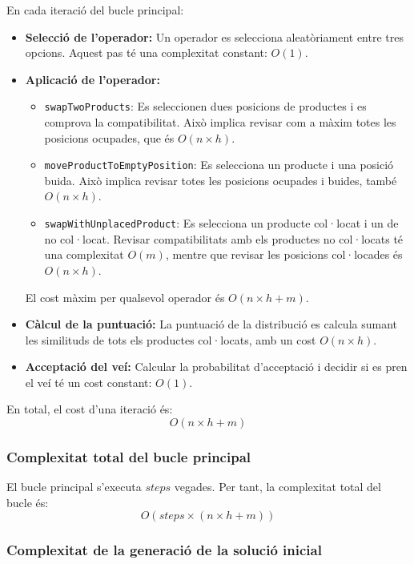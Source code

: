 \documentclass[a4paper,12pt]{report}
\begin{document}
\begin{itemize}
En cada iteració del bucle principal:
\begin{itemize}
    \item \textbf{Selecció de l'operador:} Un operador es selecciona aleatòriament entre tres opcions. Aquest pas té una complexitat constant: \(O(1)\).
    \item \textbf{Aplicació de l'operador:} 
    \begin{itemize}
        \item \texttt{swapTwoProducts}: Es seleccionen dues posicions de productes i es comprova la compatibilitat. Això implica revisar com a màxim totes les posicions ocupades, que és \(O(n \times h)\).
        \item \texttt{moveProductToEmptyPosition}: Es selecciona un producte i una posició buida. Això implica revisar totes les posicions ocupades i buides, també \(O(n \times h)\).
        \item \texttt{swapWithUnplacedProduct}: Es selecciona un producte col·locat i un de no col·locat. Revisar compatibilitats amb els productes no col·locats té una complexitat \(O(m)\), mentre que revisar les posicions col·locades és \(O(n \times h)\).
    \end{itemize}
    El cost màxim per qualsevol operador és \(O(n \times h + m)\).
    \item \textbf{Càlcul de la puntuació:} La puntuació de la distribució es calcula sumant les similituds de tots els productes col·locats, amb un cost \(O(n \times h)\).
    \item \textbf{Acceptació del veí:} Calcular la probabilitat d'acceptació i decidir si es pren el veí té un cost constant: \(O(1)\).
\end{itemize}

En total, el cost d'una iteració és:
\[
O(n \times h + m)
\]

\subsubsection{Complexitat total del bucle principal}

El bucle principal s'executa \(steps\) vegades. Per tant, la complexitat total del bucle és:
\[
O(steps \times (n \times h + m))
\]

\subsubsection{Complexitat de la generació de la solució inicial}


\end{itemize}
\end{document}
